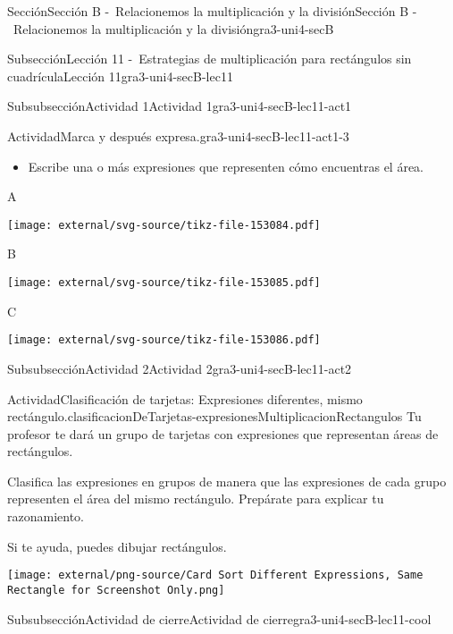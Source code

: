 \documentclass[twoside,10pt,]{article}
\begin{document}
\begin{sectionptx}{Sección}{Sección B -~Relacionemos la multiplicación y la división}{}{Sección B -~Relacionemos la multiplicación y la división}{}{}{gra3-uni4-secB}
\begin{subsectionptx}{Subsección}{Lección 11 -~Estrategias de multiplicación para rectángulos sin cuadrícula}{}{Lección 11}{}{}{gra3-uni4-secB-lec11}
\begin{subsubsectionptx}{Subsubsección}{Actividad 1}{}{Actividad 1}{}{}{gra3-uni4-secB-lec11-act1}
\begin{activity}{Actividad}{Marca y después expresa.}{gra3-uni4-secB-lec11-act1-3}
\begin{itemize}[label=\textbullet]
\item{}Escribe una o más expresiones que representen cómo encuentras el área.%
\end{itemize}
\begin{sidebyside}{3}{0}{0}{0}%
\begin{sbspanel}{0.391}%
A%
\par
\texttt{[image: external/svg-source/tikz-file-153084.pdf]}
\end{sbspanel}%
\begin{sbspanel}{0.261}%
B%
\par
\texttt{[image: external/svg-source/tikz-file-153085.pdf]}
\end{sbspanel}%
\begin{sbspanel}{0.348}%
C%
\par
\texttt{[image: external/svg-source/tikz-file-153086.pdf]}
\end{sbspanel}%
\end{sidebyside}%
\end{activity}%
\end{subsubsectionptx}
%
%
\typeout{************************************************}
\typeout{************************************************}
%
\begin{subsubsectionptx}{Subsubsección}{Actividad 2}{}{Actividad 2}{}{}{gra3-uni4-secB-lec11-act2}
\begin{activity}{Actividad}{Clasificación de tarjetas: Expresiones diferentes, mismo rectángulo.}{clasificacionDeTarjetas-expresionesMultiplicacionRectangulos}%
Tu profesor te dará un grupo de tarjetas con expresiones que representan áreas de rectángulos.%
\par
Clasifica las expresiones en grupos de manera que las expresiones de cada grupo representen el área del mismo rectángulo. Prepárate para explicar tu razonamiento.%
\par
Si te ayuda, puedes dibujar rectángulos.%
\begin{image}{0}{1}{0}{}%
\texttt{[image: external/png-source/Card Sort Different Expressions, Same Rectangle for Screenshot Only.png]}
\end{image}%
\end{activity}%
\end{subsubsectionptx}
%
%
\typeout{************************************************}
\typeout{************************************************}
%
\begin{subsubsectionptx}{Subsubsección}{Actividad de cierre}{}{Actividad de cierre}{}{}{gra3-uni4-secB-lec11-cool}

\end{subsubsectionptx}
\end{subsectionptx}
\end{sectionptx}
\end{document}
